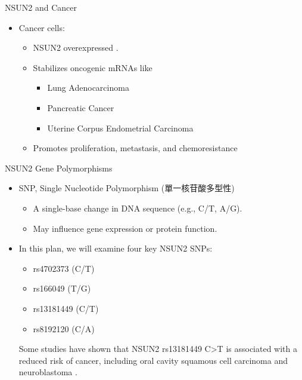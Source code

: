 \documentclass[12pt, aspectratio=43]{beamer}
\begin{document}
\begin{frame}{NSUN2 and Cancer}

\begin{itemize}
    \item Cancer cells:
    \begin{itemize}
        \item NSUN2 overexpressed \cite{Okamoto2012}.
        \item Stabilizes oncogenic mRNAs like
	\begin{itemize}
		\item Lung Adenocarcinoma \cite{Li2025}
		\item Pancreatic Cancer \cite{Zhang2023}
		\item Uterine Corpus Endometrial Carcinoma \cite{YangRNA}
	\end{itemize}
        \item Promotes proliferation, metastasis, and chemoresistance
    \end{itemize}
\end{itemize}
\end{frame}

\begin{frame}{NSUN2 Gene Polymorphisms}
	\begin{itemize}
		\item SNP, Single Nucleotide Polymorphism (單一核苷酸多型性)
		\begin{itemize}
			\item A single-base change in DNA sequence (e.g., C/T, A/G).  
			\item May influence gene expression or protein function. 
		\end{itemize}
		
		\item In this plan, we will examine four key NSUN2 SNPs:
		\begin{itemize}
			\item rs4702373 (C/T)  
			\item rs166049 (T/G)  
			\item rs13181449 (C/T)  
			\item rs8192120 (C/A)
		\end{itemize}
		Some studies have shown that NSUN2 rs13181449 C>T is associated with a reduced risk of cancer, including oral cavity squamous cell carcinoma \cite{Hung2025NSUN2} and neuroblastoma \cite{LIN2023147120}.
	\end{itemize}
\end{frame}
\end{document}
